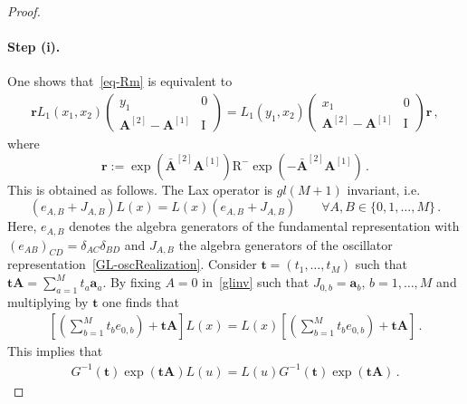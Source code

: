\documentclass[10pt,a4paper]{amsart}
\newcommand{\ID}{\mathrm{I}}
\newcommand{\M}{M}
\newcommand{\OA}{\mathbf{A}}
\newcommand{\OAD}{\mathbf{\bar{A}}}
\newcommand{\abrOSCR}{\mathrm{R}}
\begin{document}
\begin{proof}
\paragraph{Step (i).} One shows that~\eqref{eq-Rm} is equivalent to
\begin{equation}\label{equivalent-def-2}
	\begin{split}
		\mathbf{r}L_{1}(x_{1},x_{2})\left(\begin{array}{cc}
			y_1&0\\
			\OA^{[2]}-\OA^{[1]}&\ID
		\end{array}\right)=
		L_{1}(y_{1},x_{2})\left(\begin{array}{cc}
			x_1&0\\
			\OA^{[2]}-\OA^{[1]}&\ID
		\end{array}\right)\mathbf{r}\,,
	\end{split}
\end{equation}
where
\begin{equation}\label{r-definition}
	\mathbf{r}:=\exp{\left(\OAD^{[2]}\OA^{[1]}\right)}\abrOSCR^{-}\exp{\left(-\OAD^{[2]}\OA^{[1]}\right)}\,.
\end{equation}
This is obtained as follows. The Lax operator is $gl(\M+1)$ invariant, i.e.
\begin{equation}\label{glinv}
	\left(e_{A,B}+ J_{A,B}\right)L(x)=L(x)(e_{A,B}+ J_{A,B})\qquad \forall A,B\in \{0,1,\ldots, \M\}\,.
\end{equation}
Here, $e_{A,B}$ denotes the algebra generators of the fundamental representation with $(e_{AB})_{CD}=\delta_{AC}\delta_{BD}$ and $J_{A,B}$ the algebra generators of the oscillator representation~\eqref{GL-oscRealization}. Consider $\mathbf{t}=(t_{1},\ldots,t_{M})$ such that $\mathbf{t}\OA=\sum_{a=1}^{\M}t_{a}\mathbf{a}_{a}$. By fixing $A=0$ in~\eqref{glinv} such that $J_{0,b}=\mathbf{a}_{b}$, $b=1,\ldots,\M$ and multiplying by $\mathbf{t}$ one finds that
\begin{equation}
	\begin{split}
		\left[\left(\sum_{b=1}^{\M}t_{b}e_{0,b}\right)+ \mathbf{t}\OA\right]L(x)=L(x)\left[\left(\sum_{b=1}^{\M}t_{b}e_{0,b}\right)+ \mathbf{t}\OA\right]\,.
	\end{split}
\end{equation}
This implies that
\begin{equation}
	\begin{split}G^{-1}(\mathbf{t})\exp{\left(\mathbf{t}\OA\right)}L(u)=L(u)G^{-1}(\mathbf{t})\exp{\left(\mathbf{t}\OA\right)}\,.
	\end{split}

\end{equation}
\end{proof}
\end{document}
